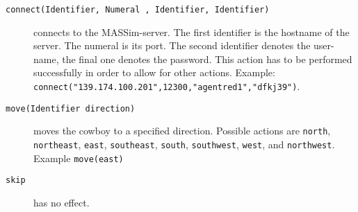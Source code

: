\documentclass[a4]{article}
\begin{document}
\medskip{}
\begin{description}
\item[\texttt{connect(Identifier, Numeral , Identifier, Identifier)}] connects to the MASSim-server.
The first identifier is the hostname of the server. The numeral is its port. The second identifier denotes the user-name,
the final one denotes the password. This action has to be performed successfully in order to allow for other actions.
Example: \texttt{connect("139.174.100.201",12300,"agentred1","dfkj39")}.
\item[\texttt{move(Identifier direction)}] moves the cowboy to a specified direction. 
Possible actions are \texttt{north}, \texttt{northeast}, \texttt{east}, \texttt{southeast}, \texttt{south}, \texttt{southwest},
\texttt{west}, and \texttt{northwest}. Example \texttt{move(east)}
\item[\texttt{skip}] has no effect.
\end{description}
\end{document}
